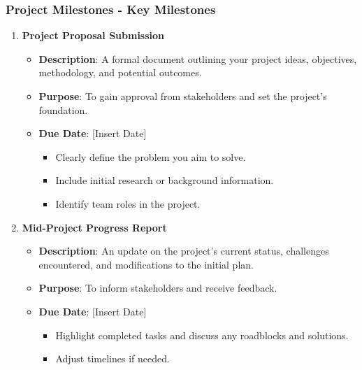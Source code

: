 \documentclass{beamer}
\begin{document}
\begin{frame}[fragile]
    \frametitle{Project Milestones - Key Milestones}
    \begin{enumerate}
        \item \textbf{Project Proposal Submission}
        \begin{itemize}
            \item \textbf{Description}: A formal document outlining your project ideas, objectives, methodology, and potential outcomes.
            \item \textbf{Purpose}: To gain approval from stakeholders and set the project's foundation.
            \item \textbf{Due Date}: [Insert Date]
            \begin{itemize}
                \item Clearly define the problem you aim to solve.
                \item Include initial research or background information.
                \item Identify team roles in the project.
            \end{itemize}
        \end{itemize}

        \item \textbf{Mid-Project Progress Report}
        \begin{itemize}
            \item \textbf{Description}: An update on the project's current status, challenges encountered, and modifications to the initial plan.
            \item \textbf{Purpose}: To inform stakeholders and receive feedback.
            \item \textbf{Due Date}: [Insert Date]
            \begin{itemize}
                \item Highlight completed tasks and discuss any roadblocks and solutions.
                \item Adjust timelines if needed.
            \end{itemize}
        \end{itemize}
    \end{enumerate}
\end{frame}
\end{document}
